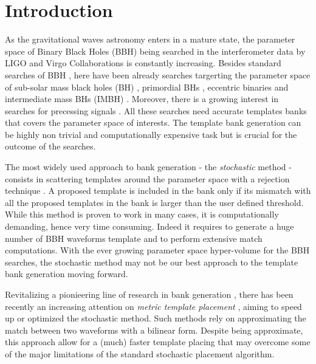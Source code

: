 \documentclass[twocolumn,showpacs,preprintnumbers,nofootinbib,prd,
superscriptaddress,10pt]{revtex4-2}
\begin{document}

\section{Introduction}

As the gravitational waves astronomy enters in a mature state, the parameter space of Binary Black Holes (BBH) being searched in the interferometer data by LIGO \cite{LIGOScientific:2014pky} and Virgo \cite{VIRGO:2014yos} Collaborations is constantly increasing. Besides standard searches of BBH \cite{GWTC-1,GWTC-2,GWTC-2.1, GWTC-3}, here have been already searches targerting the parameter space of sub-solar mass black holes (BH) \cite{SSM_O2, SSM_O3a, PhysRevD.106.023024}, primordial BHs \cite{PBH}, eccentric binaries \cite{PhysRevD.102.043005, PhysRevD.104.104016, Nitz:2019spj} and intermediate mass BHs (IMBH) \cite{IMBH_O2, IMBH_O3, Chandra:2022ixv}. Moreover, there is a growing interest in searches for precessing signals \cite{PhysRevD.89.024010, PhysRevD.97.023004, PhysRevD.102.041302, Indik:2016qky}.
All these searches need accurate templates banks that covers the parameter space of interests. The template bank generation can be highly non trivial and computationally expensive task but is crucial for the outcome of the searches.

The most widely used approach to bank generation - the {\it stochastic} method \cite{PhysRevD.80.104014, sbank} - consists in scattering templates around the parameter space with a rejection technique \cite{DalCanton:2017ala, Mukherjee:2018yra, Indik:2016qky, Lenon:2021zac}. A proposed template is included in the bank only if its mismatch with all the proposed templates in the bank is larger than the user defined threshold.
While this method is proven to work in many cases, it is computationally demanding, hence very time consuming. Indeed it requires to generate a huge number of BBH waveforms template and to perform extensive match computations.
With the ever growing parameter space hyper-volume for the BBH searches, the stochastic method may not be our best approach to the template bank generation moving forward.

Revitalizing a pionieering line of research in bank generation \cite{owen_metric, Messenger:2008ta}, there has been recently an increasing attention on {\it metric template placement} \cite{Roy:2017oul, 2018cosp...42E2899R, Coogan:2022qxs, Hanna:2022zpk}, aiming to speed up or optimized the stochastic method.
Such methods rely on approximating the match between two waveforms with a bilinear form. Despite being approximate, this approach allow for a (much) faster template placing that may overcome some of the major limitations of the standard stochastic placement algorithm.
\end{document}
